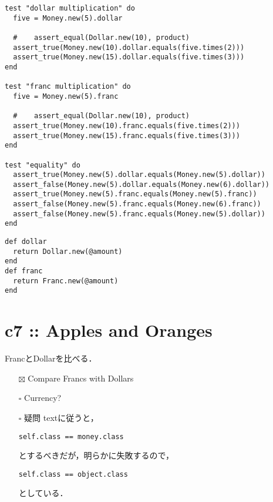 \documentclass[11pt]{article}
\begin{document}
\begin{verbatim}
test "dollar multiplication" do
  five = Money.new(5).dollar

  #    assert_equal(Dollar.new(10), product)
  assert_true(Money.new(10).dollar.equals(five.times(2)))
  assert_true(Money.new(15).dollar.equals(five.times(3)))
end

test "franc multiplication" do
  five = Money.new(5).franc

  #    assert_equal(Dollar.new(10), product)
  assert_true(Money.new(10).franc.equals(five.times(2)))
  assert_true(Money.new(15).franc.equals(five.times(3)))
end

test "equality" do
  assert_true(Money.new(5).dollar.equals(Money.new(5).dollar))
  assert_false(Money.new(5).dollar.equals(Money.new(6).dollar))
  assert_true(Money.new(5).franc.equals(Money.new(5).franc))
  assert_false(Money.new(5).franc.equals(Money.new(6).franc))
  assert_false(Money.new(5).franc.equals(Money.new(5).dollar))
end
\end{verbatim}

\begin{verbatim}
def dollar
  return Dollar.new(@amount)
end
def franc
  return Franc.new(@amount)
end
\end{verbatim}

\section{c7 :: Apples and Oranges}
\label{sec:org28bbda2}
FrancとDollarを比べる．
\begin{itemize}
\item[{$\boxtimes$}] Compare Francs with Dollars
\item[{$\square$}] Currency?

\item[{$\square$}] 疑問
textに従うと，
\begin{verbatim}
self.class == money.class
\end{verbatim}

とするべきだが，明らかに失敗するので，
\begin{verbatim}
self.class == object.class
\end{verbatim}

としている．
\end{itemize}
\end{document}
